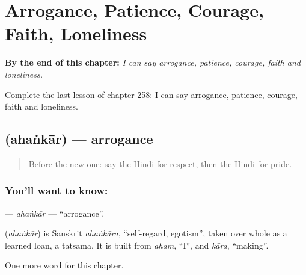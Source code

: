 
\chapter{Arrogance, Patience, Courage, Faith, Loneliness}
\label{ch:hi-arrogance-patience-courage-faith-loneliness}

\begin{chapteropening}
\textbf{By the end of this chapter:} \emph{I can say arrogance, patience, courage, faith and loneliness.}

Complete the last lesson of chapter 258: I can say arrogance, patience, courage, faith and loneliness.
\end{chapteropening}

\section[\texorpdfstring{\hi{अहंकार} (ahaṅkār)}{अहंकार (ahaṅkār)}]{ (ahaṅkār) — arrogance}

\label{lesson:HI-C258-ahankar}



\begin{quote}
Before the new one: say the Hindi for respect, then the Hindi for pride.
\end{quote}

\subsection*{You'll want to know: }
\textbf{} — \emph{ahaṅkār} — \textquotedblleft{}arrogance\textquotedblright{}.

\begin{cousinweb}
\textbf{} (\emph{ahaṅkār}) is Sanskrit \emph{ahaṅkāra}, \textquotedblleft{}self-regard, egotism\textquotedblright{}, taken over whole as a learned loan, a tatsama. It is built from \emph{aham}, \textquotedblleft{}I\textquotedblright{}, and \emph{kāra}, \textquotedblleft{}making\textquotedblright{}.
\end{cousinweb}

\begin{grammarlens}[title={What you've built}]
One more word for this chapter.
\end{grammarlens}

